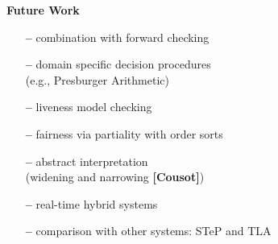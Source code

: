 \documentclass[landscape]{slides}
\begin{document}
\begin{slide}\large\parskip=0pt
  \textbf{Future Work}

  \begin{itemize}\itemsep=0pt
  \item[\bf --] combination with forward checking
  \item[\bf --] domain specific decision procedures\\ (e.g.,
    Presburger Arithmetic)
  \item[\bf --] liveness model checking
  \item[\bf --] fairness via partiality with order sorts
  \item[\bf --] abstract interpretation\\ (widening and narrowing
    \textbf{[Cousot]})
  \item[\bf --] real-time hybrid systems
  \item[\bf --] comparison with other systems: STeP and TLA
  \end{itemize}

\end{slide}
\end{document}

